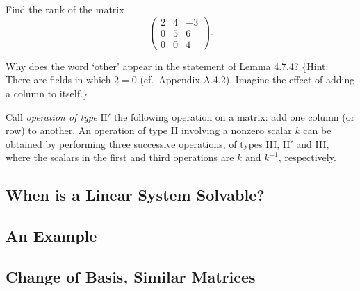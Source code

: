 \begin{tcolorbox}[title=Exercise 2, breakable]
    Find the rank of the matrix
    \[
    \begin{pmatrix}
        2 & 4 & -3 \\
        0 & 5 & 6 \\
        0 & 0 & 4
    \end{pmatrix}.
    \]
\end{tcolorbox}

\begin{tcolorbox}[title=Exercise 4, breakable]
    Why does the word `other' appear in the statement of Lemma 4.7.4?
    \{Hint: There are fields in which $2 = 0$ (cf.\ Appendix A.4.2).
    Imagine the effect of adding a column to itself.\}
\end{tcolorbox}

\begin{tcolorbox}[title=Exercise 5, breakable]
    Call \textit{operation of type} II$'$ the following operation on a matrix: add one column (or row) to another.
    An operation of type II involving a nonzero scalar $k$ can be obtained by performing three successive operations,
    of types III, II$'$ and III, where the scalars in the first and third operations are $k$ and $k^{-1}$, respectively.
\end{tcolorbox}

\subsection{When is a Linear System Solvable?}

\subsection{An Example}

\subsection{Change of Basis, Similar Matrices}